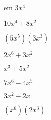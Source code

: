 \documentclass{article}
\begin{document}
\begin{multicols}{2}
em $3x^{4}$\item $10x^{4}+8x^2$\item $(5x^{5})(3x^{3})$\item $2x^{6}+3x^2$\item $x^{3}+5x^2$\item $7x^{6}-4x^{5}$\item $3x^2-2x$\item $(x^{6})(2x^{3})$\ite
\end{multicols}
\end{document}
